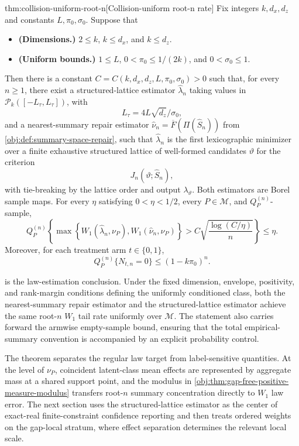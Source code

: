 \documentclass[11pt]{article}
\begin{document}
\begin{theoremv}{thm:collision-uniform-root-n}[Collision-uniform root-n rate]
Fix integers \(k,d_x,d_z\) and constants \(L,\pi_0,\sigma_0\).  Suppose that
\begin{itemize}
\item \textbf{(Dimensions.)} \(2\le k\), \(k\le d_x\), and \(k\le d_z\).
\item \textbf{(Uniform bounds.)} \(1\le L\), \(0<\pi_0\le 1/(2k)\), and \(0<\sigma_0\le 1\).
\end{itemize}
Then there is a constant \(C=C(k,d_x,d_z,L,\pi_0,\sigma_0)>0\) such that, for every \(n\ge 1\), there exist a structured-lattice estimator \(\widehat\lambda_n\) taking values in \(\mathcal P_k([-L_\tau,L_\tau])\), with
\[
L_\tau=4L\sqrt{d_z}/\sigma_0,
\]
and a nearest-summary repair estimator \(\widehat\nu_n=\overline F(\Pi(\widehat S_n))\) from \cref{obj:def:summary-space-repair}, such that \(\widehat\lambda_n\) is the first lexicographic minimizer over a finite exhaustive structured lattice of well-formed candidates \(\vartheta\) for the criterion
\[
J_n(\vartheta;\widehat S_n),
\]
with tie-breaking by the lattice order and output \(\lambda_\vartheta\).  Both estimators are Borel sample maps.  For every \(\eta\) satisfying \(0<\eta<1/2\), every \(P\in\mathcal M\), and \(Q_P^{(n)}\)-sample,
\[
Q_P^{(n)}\!\left\{
\max\!\left\{
W_1(\widehat\lambda_n,\nu_P),
W_1(\widehat\nu_n,\nu_P)
\right\}
>
C\sqrt{\frac{\log(C/\eta)}{n}}
\right\}\le \eta .
\]
Moreover, for each treatment arm \(t\in\{0,1\}\),
\[
Q_P^{(n)}\{N_{t,n}=0\}\le (1-k\pi_0)^n .
\]
\end{theoremv}

 is the law-estimation conclusion. Under the fixed dimension, envelope, positivity, and rank-margin conditions defining the uniformly conditioned class, both the nearest-summary repair estimator and the structured-lattice estimator achieve the same root-\(n\) \(W_1\) tail rate uniformly over \(\mathcal M\). The statement also carries forward the armwise empty-sample bound, ensuring that the total empirical-summary convention is accompanied by an explicit probability control.

The theorem separates the regular law target from label-sensitive quantities. At the level of \(\nu_P\), coincident latent-class mean effects are represented by aggregate mass at a shared support point, and the modulus in \cref{obj:thm:gap-free-positive-measure-modulus} transfers root-\(n\) summary concentration directly to \(W_1\) law error. The next section uses the structured-lattice estimator as the center of exact-real finite-constraint confidence reporting and then treats ordered weights on the gap-local stratum, where effect separation determines the relevant local scale.
\end{document}
